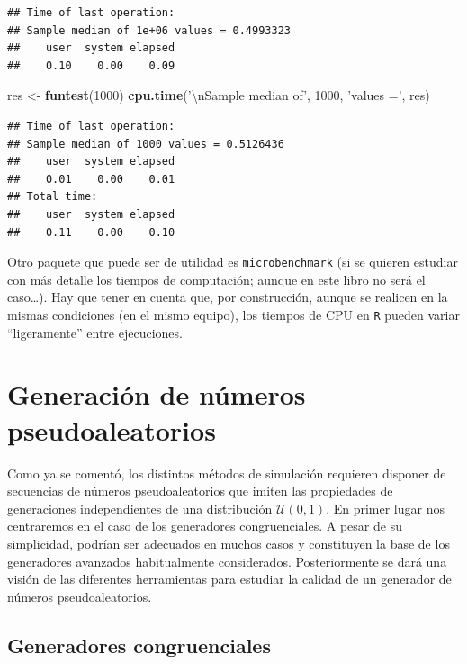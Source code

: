 \documentclass[
]{book}
\newenvironment{Shaded}{\begin{snugshade}}{\end{snugshade}}
\newcommand{\CharTok}[1]{\textcolor[rgb]{0.31,0.60,0.02}{#1}}
\newcommand{\DecValTok}[1]{\textcolor[rgb]{0.00,0.00,0.81}{#1}}
\newcommand{\KeywordTok}[1]{\textcolor[rgb]{0.13,0.29,0.53}{\textbf{#1}}}
\newcommand{\NormalTok}[1]{#1}
\newcommand{\StringTok}[1]{\textcolor[rgb]{0.31,0.60,0.02}{#1}}
\theoremstyle{break}
\theoremstyle{definition}
\theoremstyle{definition}
\theoremstyle{definition}
\theoremstyle{remark}
\begin{document}
\begin{verbatim}
## Time of last operation: 
## Sample median of 1e+06 values = 0.4993323 
##    user  system elapsed 
##    0.10    0.00    0.09
\end{verbatim}

\begin{Shaded}
\begin{Highlighting}[]
\NormalTok{res <-}\StringTok{ }\KeywordTok{funtest}\NormalTok{(}\DecValTok{1000}\NormalTok{)}
\KeywordTok{cpu.time}\NormalTok{(}\StringTok{'}\CharTok{\textbackslash{}n}\StringTok{Sample median of'}\NormalTok{, }\DecValTok{1000}\NormalTok{, }\StringTok{'values ='}\NormalTok{, res)}
\end{Highlighting}
\end{Shaded}

\begin{verbatim}
## Time of last operation: 
## Sample median of 1000 values = 0.5126436 
##    user  system elapsed 
##    0.01    0.00    0.01 
## Total time:
##    user  system elapsed 
##    0.11    0.00    0.10
\end{verbatim}

Otro paquete que puede ser de utilidad es
\href{https://CRAN.R-project.org/package=microbenchmark}{\texttt{microbenchmark}}
(si se quieren estudiar con más detalle los tiempos de computación;
aunque en este libro no será el caso\ldots).
Hay que tener en cuenta que, por construcción, aunque se realicen en la mismas
condiciones (en el mismo equipo), los tiempos de CPU en \texttt{R} pueden variar
``ligeramente'' entre ejecuciones.

\hypertarget{cap3}{%
\chapter{Generación de números pseudoaleatorios}\label{cap3}}

Como ya se comentó, los distintos métodos de simulación requieren disponer de secuencias de números pseudoaleatorios que imiten las propiedades de generaciones independientes de una distribución \(\mathcal{U}(0,1)\).
En primer lugar nos centraremos en el caso de los generadores congruenciales. A pesar de su simplicidad, podrían ser adecuados en muchos casos y constituyen la base de los generadores avanzados habitualmente considerados.
Posteriormente se dará una visión de las diferentes herramientas para estudiar la calidad de un generador de números pseudoaleatorios.

\hypertarget{gen-cong}{%
\section{Generadores congruenciales}\label{gen-cong}}
\end{document}
